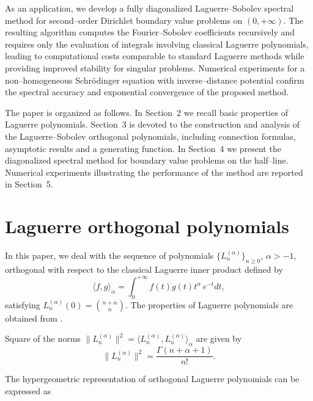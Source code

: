 \documentclass[reqno,10pt]{amsart}
\theoremstyle{plain}
\numberwithin{equation}{section}
\numberwithin{figure}{section}
\begin{document}
As an application, we develop a fully diagonalized Laguerre--Sobolev spectral method for second--order Dirichlet boundary value problems on $(0,+\infty)$. The resulting algorithm computes the Fourier--Sobolev coefficients recursively and requires only the evaluation of integrals involving classical Laguerre polynomials, leading to computational costs comparable to standard Laguerre methods while providing improved stability for singular problems. Numerical experiments for a non--homogeneous Schr\"odinger equation with inverse--distance potential confirm the spectral accuracy and exponential convergence of the proposed method.  

The paper is organized as follows. In Section~2 we recall basic properties of Laguerre polynomials. Section~3 is devoted to the construction and analysis of the Laguerre--Sobolev orthogonal polynomials, including connection formulas, asymptotic results and a generating function. In Section~4 we present the diagonalized spectral method for boundary value problems on the half--line. Numerical experiments illustrating the performance of the method are reported in Section~5.


\section{
Laguerre orthogonal polynomials
}

In this paper, we deal with the sequence of polynomials $\{L^{(\alpha)}_n\}_{n\geqslant0}$, $\alpha > -1,$ orthogonal with respect to the classical Laguerre inner product defined by
\begin{equation}\label{Laguerre_ip}
\langle f, g\rangle_{\alpha}
= \int_{0}^{+\infty} f(t) g(t)  t^\alpha\,e^{-t} dt,
\end{equation}
satisfying  $L^{(\alpha)}_n(0) = \binom{n+\alpha}{n}$. The properties of Laguerre polynomials are obtained from \cite{Szego75}.

Square of the norms $\|L^{(\alpha)}_n\|^2 =
\langle L^{(\alpha)}_n, L^{(\alpha)}_n\rangle_{\alpha}$ are given by
\begin{equation}\label{norm-Laguerre}
\|L^{(\alpha)}_n\|^2 = \frac{\Gamma(n+\alpha+1)}{n!}.
\end{equation}


The hypergeometric representation of orthogonal Laguerre polynomials can be expressed as
\end{document}
